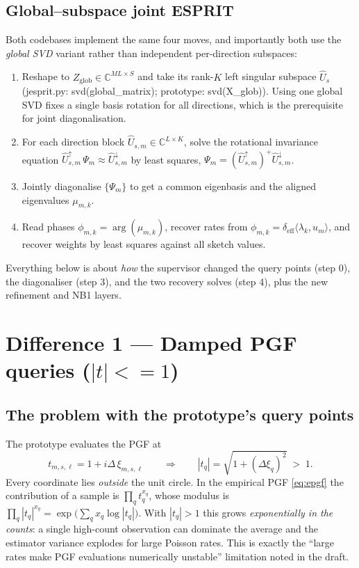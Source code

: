 \documentclass[11pt]{article}
\newcommand{\C}{\mathbb{C}}
\newcommand{\inner}[2]{\langle #1, #2 \rangle}
\newcommand{\lam}{\bm{\lambda}}
\newcommand{\bu}{\bm{u}}
\newcommand{\bt}{\bm{t}}
\newcommand{\bxi}{\bm{\xi}}
\newcommand{\deff}{\delta_{\mathrm{eff}}}
\newcommand{\code}[1]{\texttt{\small #1}}
\def\code#1{#1}%
\def\small{}%
\def\bm#1{#1}%
\def\bt{t}%
\def\le{<=}%
\theoremstyle{definition}
\begin{document}
\subsection{Global--subspace joint ESPRIT}
Both codebases implement the same four moves, and importantly both use the
\emph{global SVD} variant rather than independent per-direction subspaces:
\begin{enumerate}[leftmargin=2em, itemsep=1pt]
  \item Reshape to $Z_{\mathrm{glob}}\in\C^{ML\times S}$ and take its rank-$K$ left singular
        subspace $\widehat U_s$ (\code{jesprit.py}: \code{svd(global\_matrix)}; prototype:
        \code{svd(X\_glob)}). Using one global SVD fixes a single basis rotation for all
        directions, which is the prerequisite for joint diagonalisation.
  \item For each direction block $\widehat U_{s,m}\in\C^{L\times K}$, solve the rotational
        invariance equation $\widehat U_{s,m}^{\uparrow}\,\Psi_m \approx \widehat U_{s,m}^{\downarrow}$
        by least squares, $\Psi_m = (\widehat U_{s,m}^{\uparrow})^{+}\widehat U_{s,m}^{\downarrow}$.
  \item Jointly diagonalise $\{\Psi_m\}$ to get a common eigenbasis and the aligned
        eigenvalues $\mu_{m,k}$.
  \item Read phases $\phi_{m,k}=\arg(\mu_{m,k})$, recover rates from
        $\phi_{m,k}=\deff\inner{\lam_k}{\bu_m}$, and recover weights by least squares against
        all sketch values.
\end{enumerate}
Everything below is about \emph{how} the supervisor changed the query points (step 0),
the diagonaliser (step 3), and the two recovery solves (step 4), plus the new refinement and
NB1 layers.

\section{Difference 1 --- Damped PGF queries ($|\bt|\le1$)}\label{sec:damping}

\subsection{The problem with the prototype's query points}
The prototype evaluates the PGF at
\[
\bt_{m,s,\ell}=\bm1+i\Delta\,\bxi_{m,s,\ell}
\qquad\Longrightarrow\qquad
|t_q| = \sqrt{1+(\Delta\xi_q)^2}\;>\;1 .
\]
Every coordinate lies \emph{outside} the unit circle. In the empirical PGF \eqref{eq:epgf}
the contribution of a sample is $\prod_q t_q^{x_q}$, whose modulus is
$\prod_q |t_q|^{x_q} = \exp\!\big(\sum_q x_q\log|t_q|\big)$. With $|t_q|>1$ this grows
\emph{exponentially in the counts}: a single high-count observation can dominate the average
and the estimator variance explodes for large Poisson rates. This is exactly the
``large rates make PGF evaluations numerically unstable'' limitation noted in the draft.
\end{document}
